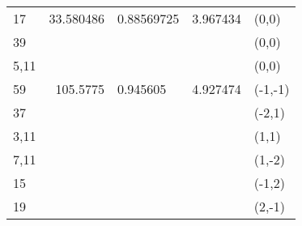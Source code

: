 \begin{table}
\begin{tabular}{l|r|l|l|l}
    \hline
17 & 33.580486 & 0.88569725
                 & 3.967434 & (0,0) \\
39 &           & &          & (0,0) \\
5,11 &         & &          & (0,0) \\
    \hline
59   & 105.5775 & 0.945605
                  &  4.927474 & (-1,-1) \\
37   &          & &         & (-2,1) \\
3,11 &          & &         & (1,1) \\
7,11 &          & &         & (1,-2) \\
15  &           & &         & (-1,2) \\
19   &          & &         & (2,-1) \\
	\hline
    \end{tabular}
\label{tab:ListLength2}
\end{table}
